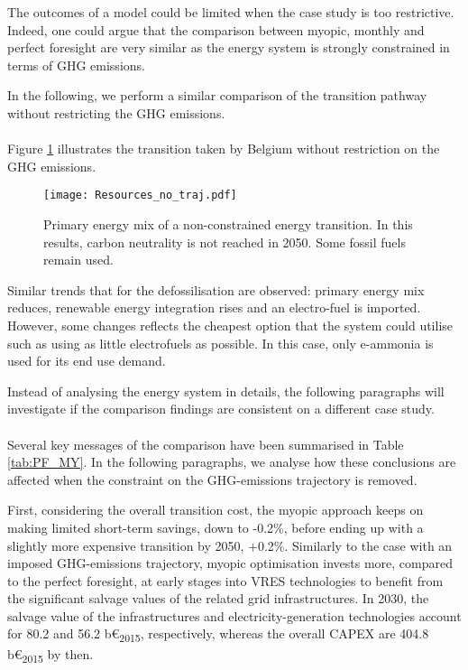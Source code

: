 The outcomes of a model could be limited when the case study is too restrictive. Indeed, one could argue that the comparison between myopic, monthly and perfect foresight are very similar as the energy system is strongly constrained in terms of \gls{GHG} emissions.

In the following, we perform a similar comparison of the transition pathway without restricting the \gls{GHG} emissions. \\

\\

\noindent
Figure \ref{fig:EnergyMixPathwayWithoutGHGLimit} illustrates the transition taken by Belgium without restriction on the \gls{GHG} emissions. 

 \begin{figure}[!htbp]
\centering
\texttt{[image: Resources\_no\_traj.pdf]}
\caption{Primary energy mix of a non-constrained energy transition. In this results, carbon neutrality is not reached in 2050. Some fossil fuels remain used.}
\label{fig:EnergyMixPathwayWithoutGHGLimit}
\end{figure}

Similar trends that for the defossilisation are observed: primary energy mix reduces, renewable energy integration rises and an electro-fuel is imported. However, some changes reflects the cheapest option that the system could utilise such as using as little electrofuels as possible. In this case, only e-ammonia is used for its end use demand.

Instead of analysing the energy system in details, the following paragraphs will investigate if the comparison findings are consistent on a different case study.\\

\\

\noindent
Several key messages of the comparison have been summarised in Table \ref{tab:PF_MY}. In the following paragraphs, we analyse how these conclusions are affected when the constraint on the \gls{GHG}-emissions trajectory is removed. 

First, considering the overall transition cost, the myopic approach keeps on making limited short-term savings, \ie down to -0.2\%, before ending up with a slightly more expensive transition by 2050, \ie +0.2\%. Similarly to the case with an imposed \gls{GHG}-emissions trajectory, myopic optimisation invests more, compared to the perfect foresight, at early stages into \gls{VRES} technologies to benefit from the significant salvage values of the related grid infrastructures. In 2030, the salvage value of the infrastructures and electricity-generation technologies account for 80.2 and 56.2 b€\textsubscript{2015}, respectively, whereas the overall CAPEX are 404.8 b€\textsubscript{2015} by then.

